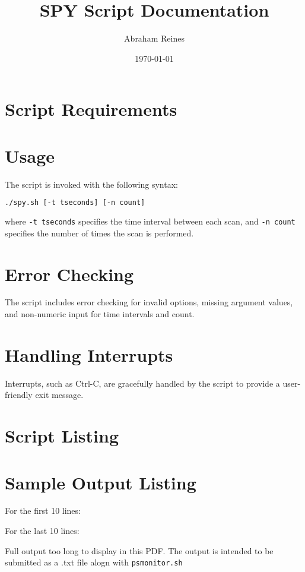 \documentclass{article}
\title{SPY Script Documentation}
\author{Abraham Reines}
\date{\today}
\begin{document}
\maketitle

\section{Script Requirements}

\section{Usage}
The script is invoked with the following syntax:
\begin{lstlisting}[language=bash]
./spy.sh [-t tseconds] [-n count]
\end{lstlisting}
where \texttt{-t tseconds} specifies the time interval between each scan, and \texttt{-n count} specifies the number of times the scan is performed.

\section{Error Checking}
The script includes error checking for invalid options, missing argument values, and non-numeric input for time intervals and count.

\section{Handling Interrupts}
Interrupts, such as Ctrl-C, are gracefully handled by the script to provide a user-friendly exit message.

\section{Script Listing}


\section{Sample Output Listing}
For the first 10 lines:


For the last 10 lines:


{\color{red}Full output too long to display in this PDF. The output is intended to be submitted as a .txt file alogn with \texttt{psmonitor.sh} }
\end{document}
